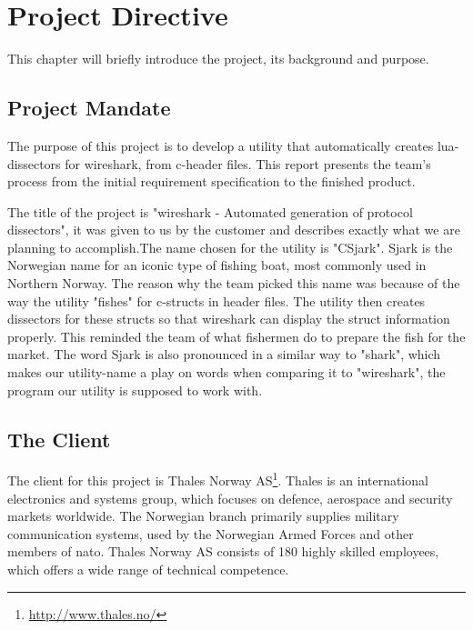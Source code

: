 \chapter{Project Directive}
This chapter will briefly introduce the project, its background and purpose.


\section{Project Mandate}
The purpose of this project is to develop a \gls{utility} that automatically creates \Gls{lua}-\glspl{dissector} for \Gls{wireshark}, from \Gls{c}-\gls{header} files. This report presents the team’s process from the initial requirement specification to the finished product. 

The title of the project is "\Gls{wireshark} - Automated generation of \gls{protocol} \glspl{dissector}", it was given to us by the customer and describes exactly what we are planning to accomplish.The name chosen for the \gls{utility} is "CSjark". Sjark is the Norwegian name for an iconic type of fishing boat, most commonly used in Northern Norway. The reason why the team picked this name was because of the way the \gls{utility} "fishes" for \Gls{c}-\glspl{struct} in \gls{header} files. The \gls{utility} then creates \glspl{dissector} for these \glspl{struct} so that \Gls{wireshark} can display the \gls{struct} information properly. This reminded the team of what fishermen do to prepare the fish for the market. The word Sjark is also pronounced in a similar way to "shark", which makes our \gls{utility}-name a play on words when comparing it to "\Gls{wireshark}", the program our \gls{utility} is supposed to work with.


\section{The Client}
The client for this project is
Thales Norway AS\footnote{\url{http://www.thales.no/}}. Thales is an
international electronics and systems group, which focuses on defence,
aerospace and security markets worldwide. The Norwegian branch primarily
supplies military communication systems, used by the Norwegian Armed Forces
and other members of \Gls{nato}. Thales Norway AS consists of 180 highly skilled
employees, which offers a wide range of technical competence.\cite{ThalesNO}


